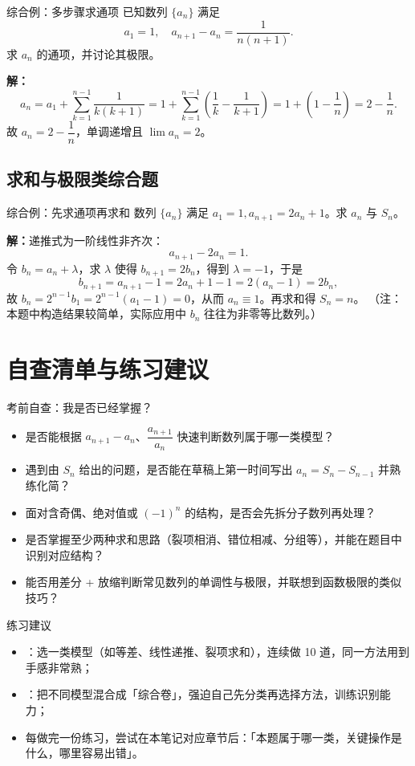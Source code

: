 \documentclass[a4paper,11pt]{ctexart}
\begin{document}
\begin{examplebox}{综合例：多步骤求通项}
  已知数列 $\{a_n\}$ 满足
  \[
    a_1=1,\quad a_{n+1}-a_n=\frac{1}{n(n+1)}.
  \]
  求 $a_n$ 的通项，并讨论其极限。

  \textbf{解：}
  \[
    a_n=a_1+\sum_{k=1}^{n-1}\frac{1}{k(k+1)}
    =1+\sum_{k=1}^{n-1}\left(\frac{1}{k}-\frac{1}{k+1}\right)
    =1+\left(1-\frac{1}{n}\right)=2-\frac{1}{n}.
  \]
  故 $a_n=2-\dfrac{1}{n}$，单调递增且 $\lim a_n=2$。
\end{examplebox}

\subsection{求和与极限类综合题}

\begin{examplebox}{综合例：先求通项再求和}
  数列 $\{a_n\}$ 满足 $a_1=1,a_{n+1}=2a_n+1$。求 $a_n$ 与 $S_n$。

  \textbf{解：}递推式为一阶线性非齐次：
  \[
    a_{n+1}-2a_n=1.
  \]
  令 $b_n=a_n+\lambda$，求 $\lambda$ 使得 $b_{n+1}=2b_n$，得到 $\lambda=-1$，于是
  \[
    b_{n+1}=a_{n+1}-1=2a_n+1-1=2(a_n-1)=2b_n,
  \]
  故 $b_n=2^{n-1}b_1=2^{n-1}(a_1-1)=0$，从而 $a_n\equiv1$。再求和得 $S_n=n$。
  （注：本题中构造结果较简单，实际应用中 $b_n$ 往往为非零等比数列。）
\end{examplebox}

\clearpage
\section{自查清单与练习建议}

\begin{summarybox}{考前自查：我是否已经掌握？}
  \begin{itemize}
    \item 是否能根据 $a_{n+1}-a_n$、$\dfrac{a_{n+1}}{a_n}$ 快速判断数列属于哪一类模型？
    \item 遇到由 $S_n$ 给出的问题，是否能在草稿上第一时间写出 $a_n=S_n-S_{n-1}$ 并熟练化简？
    \item 面对含奇偶、绝对值或 $(-1)^n$ 的结构，是否会先拆分子数列再处理？
    \item 是否掌握至少两种求和思路（裂项相消、错位相减、分组等），并能在题目中识别对应结构？
    \item 能否用差分 + 放缩判断常见数列的单调性与极限，并联想到函数极限的类似技巧？
  \end{itemize}
\end{summarybox}

\begin{notebox}{练习建议}
  \begin{itemize}
    \item {}：选一类模型（如等差、线性递推、裂项求和），连续做 10 道，同一方法用到手感非常熟；
    \item {}：把不同模型混合成「综合卷」，强迫自己先分类再选择方法，训练识别能力；
    \item 每做完一份练习，尝试在本笔记对应章节后：「本题属于哪一类，关键操作是什么，哪里容易出错」。
  \end{itemize}
\end{notebox}
\end{document}
